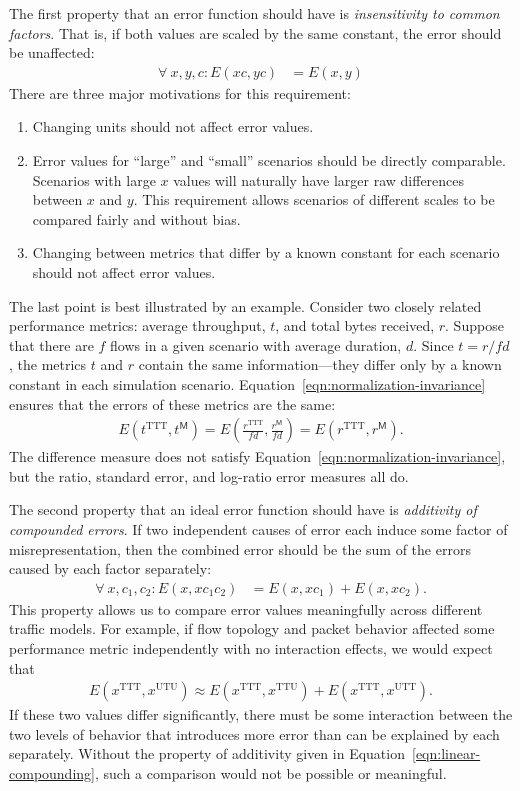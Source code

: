 \documentclass[conference]{IEEEtran}
\newcommand{\M}{\mathsf{M}}
\newcommand{\TTT}{\text{TTT}}
\newcommand{\TTU}{\text{TTU}}
\newcommand{\UTU}{\text{UTU}}
\newcommand{\UTT}{\text{UTT}}
\begin{document}
The first property that an error function should have is  \textit{insensitivity to common factors}. That is, if both values are scaled by the same constant, the error should be unaffected:
\begin{align}
\label{eqn:normalization-invariance}
\forall\: x,y,c: E(x c,y c) &= E(x,y)
\end{align}
There are three major motivations for this requirement:
\begin{enumerate}
\item Changing units should not affect error values.
\item Error values for ``large'' and ``small'' scenarios should be directly comparable. Scenarios with large $x$ values will naturally have larger raw differences between $x$ and $y$. This requirement allows scenarios of different scales to be compared fairly and without bias.
\item Changing between metrics that differ by a known constant for each scenario should not affect error values.
\end{enumerate}
The last point is best illustrated by an example. Consider two closely related performance metrics: average throughput, $t$, and total bytes received, $r$. Suppose that there are $f$ flows in a given scenario with average duration, $d$. Since $t =r/fd$, the metrics $t$ and $r$ contain the same information---they differ only by a known constant in each simulation scenario. Equation~\ref{eqn:normalization-invariance} ensures that the errors of these metrics are the same:
\begin{align}
E(t^\TTT,t^\M)
	= E\left({\frac{r^\TTT}{fd},\frac{r^\M}{fd}}\right)
	= E(r^\TTT,r^\M).
\end{align}
The difference measure does not satisfy Equation~\ref{eqn:normalization-invariance}, but the ratio, standard error, and log-ratio error measures all do.

The second property that an ideal error function should have is  \textit{additivity of compounded errors}. If two independent causes of error each induce some factor of misrepresentation, then the combined error should be the sum of the errors caused by each factor separately:
\begin{align}
\label{eqn:linear-compounding}
\forall\: x,c_1,c_2:
	E(x,x c_1 c_2) &= E(x,x c_1) + E(x,x c_2).
\end{align}
This property allows us to compare error values meaningfully across different traffic models. For example, if flow topology and packet behavior affected some performance metric independently with no interaction effects, we would expect that
\begin{align}
E(x^\TTT,x^\UTU) \approx E(x^\TTT,x^\TTU) + E(x^\TTT,x^\UTT).
\end{align}
If these two values differ significantly, there must be some interaction between the two levels of behavior that introduces more error than can be explained by each separately. Without the property of additivity given in Equation~\ref{eqn:linear-compounding}, such a comparison would not be possible or meaningful.
\end{document}
